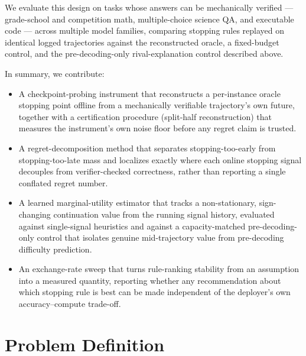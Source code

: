 \documentclass[11pt]{article}
\begin{document}
We evaluate this design on tasks whose answers can be mechanically verified --- grade-school and competition math, multiple-choice science QA, and executable code --- across multiple model families, comparing stopping rules replayed on identical logged trajectories against the reconstructed oracle, a fixed-budget control, and the pre-decoding-only rival-explanation control described above.

In summary, we contribute:
\begin{itemize}[leftmargin=1.4em]
\item A checkpoint-probing instrument that reconstructs a per-instance oracle stopping point offline from a mechanically verifiable trajectory's own future, together with a certification procedure (split-half reconstruction) that measures the instrument's own noise floor before any regret claim is trusted.
\item A regret-decomposition method that separates stopping-too-early from stopping-too-late mass and localizes exactly where each online stopping signal decouples from verifier-checked correctness, rather than reporting a single conflated regret number.
\item A learned marginal-utility estimator that tracks a non-stationary, sign-changing continuation value from the running signal history, evaluated against single-signal heuristics and against a capacity-matched pre-decoding-only control that isolates genuine mid-trajectory value from pre-decoding difficulty prediction.
\item An exchange-rate sweep that turns rule-ranking stability from an assumption into a measured quantity, reporting whether any recommendation about which stopping rule is best can be made independent of the deployer's own accuracy--compute trade-off.
\end{itemize}

\section{Problem Definition}
\end{document}
